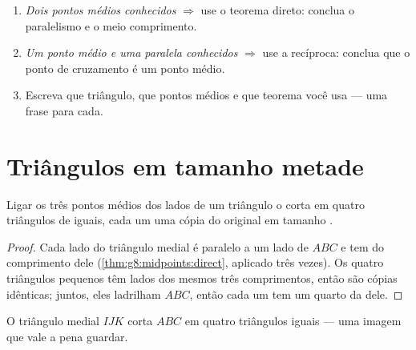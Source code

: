 \begin{method}\label{met:g8:midpoints:choose}
\begin{enumerate}
  \item \emph{Dois pontos médios conhecidos} $\Rightarrow$ use o
        teorema direto: conclua o paralelismo e o meio comprimento.
  \item \emph{Um ponto médio e uma paralela conhecidos} $\Rightarrow$
        use a recíproca: conclua que o ponto de cruzamento é um ponto
        médio.
  \item Escreva que triângulo, que pontos médios e que teorema você
        usa --- uma frase para cada.
\end{enumerate}
\end{method}

\section{Triângulos em tamanho metade}

\begin{proposition}\label{prop:g8:midpoints:medial}
Ligar os três pontos médios dos lados de um triângulo o corta em quatro
triângulos de  iguais, cada um uma cópia do original em tamanho
.
\end{proposition}

\begin{proof}
Cada lado do triângulo medial é paralelo a um lado de $ABC$ e tem
 do comprimento dele (\cref{thm:g8:midpoints:direct}, aplicado
três vezes). Os quatro triângulos pequenos têm lados dos mesmos três
comprimentos, então são cópias idênticas; juntos, eles ladrilham
$ABC$, então cada um tem um quarto da  dele.
\end{proof}

\begin{omfigure}

{\small O triângulo medial $IJK$ corta $ABC$ em quatro triângulos
iguais --- uma imagem que vale a pena guardar.}
\end{omfigure}

